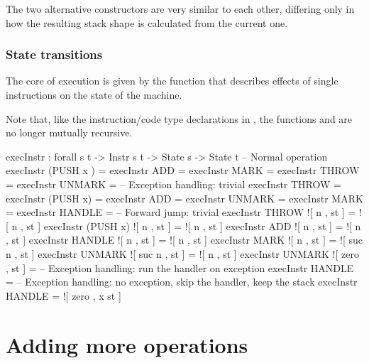 \noindent The two alternative constructors are very similar to each other,
differing only in how the resulting stack shape is calculated from the current
one.

\subsubsection{State transitions}

The core of execution is given by the function  that describes
effects of single instructions on the state of the machine.

Note that, like the instruction/code type declarations in ,
the functions  and  are no longer mutually
recursive.

\begin{codei}
  execInstr : forall {s t} -> Instr s t -> State s -> State t
  -- Normal operation
  execInstr (PUSH  x ) \tick[         	st ] = \tick[ x \scons st ]
  execInstr  ADD        = \tick[ (x + y) \scons st ]
  execInstr  MARK      \tick[          	st ] = 
  execInstr  THROW     \tick[          	st ] = 
  execInstr  UNMARK     = \tick[ x \scons st ]
  -- Exception handling: trivial
  execInstr  THROW		\x[     n , st ] = \x[     n , st ]
  execInstr (PUSH x)	\x[     n , st ] = \x[     n , st ]
  execInstr  ADD		\x[     n , st ] = \x[     n , st ]
  execInstr  UNMARK		\x[     n , st ] = \x[     n , st ]
  execInstr  MARK		\x[     n , st ] = \x[ suc n , st ]
  execInstr  HANDLE		\x[ suc n , st ] = \x[     n , st ]
  -- Forward jump: trivial
  execInstr  THROW		![ n , st ] = ![ n , st ]
  execInstr (PUSH x)	![ n , st ] = ![ n , st ]
  execInstr  ADD		![ n , st ] = ![ n , st ]
  execInstr  HANDLE		![ n , st ] = ![ n , st ]
  execInstr  MARK		![     n , st ] = ![ suc n , st ]
  execInstr  UNMARK		![ suc n , st ] = ![     n , st ]
  execInstr  UNMARK		![ zero  , st ] = \tick[ st ]
  -- Exception handling: run the handler on exception
  execInstr  HANDLE		\x[ zero , st ] = \tick[ st ]
  -- Exception handling: no exception, skip the handler, keep the stack
  execInstr  HANDLE		 = ![ zero , x \scons st ]
\end{codei}

\section{Adding more operations}

